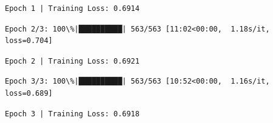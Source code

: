 \documentclass[11pt]{article}
\begin{document}
    \begin{Verbatim}[commandchars=\\\{\}]
Epoch 1 | Training Loss: 0.6914
    \end{Verbatim}

    \begin{Verbatim}[commandchars=\\\{\}]
Epoch 2/3: 100\%|██████████| 563/563 [11:02<00:00,  1.18s/it, loss=0.704]
    \end{Verbatim}

    \begin{Verbatim}[commandchars=\\\{\}]
Epoch 2 | Training Loss: 0.6921
    \end{Verbatim}

    \begin{Verbatim}[commandchars=\\\{\}]
Epoch 3/3: 100\%|██████████| 563/563 [10:52<00:00,  1.16s/it, loss=0.689]
    \end{Verbatim}

    \begin{Verbatim}[commandchars=\\\{\}]
Epoch 3 | Training Loss: 0.6918
    \end{Verbatim}

    \begin{Verbatim}[commandchars=\\\{\}]

    \end{Verbatim}
\end{document}
